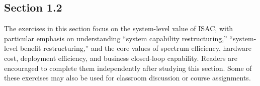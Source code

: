 %
%
%

\subsection*{Section 1.2}

\noindent
The exercises in this section focus on the system-level value of ISAC, with particular
emphasis on understanding ``system capability restructuring,'' ``system-level benefit
restructuring,'' and the core values of spectrum efficiency, hardware cost, deployment
efficiency, and business closed-loop capability. Readers are encouraged to complete
them independently after studying this section. Some of these exercises may also be
used for classroom discussion or course assignments.

